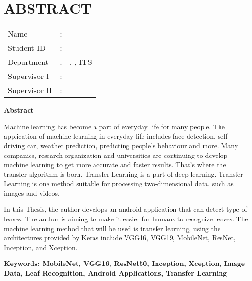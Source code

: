 \chapter {ABSTRACT}
\noindent\textbf{\MakeUppercase\juduleng}
\vspace*{1em}

\begin{tabularx}{\linewidth}{ l l X }
	Name 			& : & \penulis \\
	Student ID		& :	& \nrp \\
	Department 		& : & \jurusaneng, \newline \fakultaseng, ITS \\
	Supervisor I 	& : & \pembimbingsatu \\
	Supervisor II 	& : & \pembimbingdua
	\vspace*{1em} 	%
\end {tabularx}
	
\noindent\textbf{Abstract} \\
\itshape
\par Machine learning has become a part of everyday life for many people. The application of machine learning in everyday life includes face detection, self-driving car, weather prediction, predicting people's behaviour and more. Many companies, research organization and universities are continuing to develop machine learning to get more accurate and faster results. That's where the transfer algorithm is born. Transfer Learning is a part of deep learning. Transfer Learning is one method suitable for processing two-dimensional data, such as images and videos.
\par In this Thesis, the author develops an android application that can detect type of leaves. The author is aiming to make it easier for humans to recognize leaves. The machine learning method that will be used is transfer learning, using the architectures provided by Keras include VGG16, VGG19, MobileNet, ResNet, Inception, and Xception.

\vspace*{1em}
\noindent\bfseries Keywords: MobileNet, VGG16, ResNet50, Inception, Xception, Image Data, Leaf Recognition, Android Applications, Transfer Learning
\normalfont
\cleardoublepage